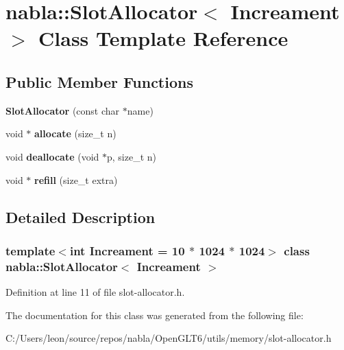 \hypertarget{classnabla_1_1_slot_allocator}{}\section{nabla\+::Slot\+Allocator$<$ Increament $>$ Class Template Reference}
\label{classnabla_1_1_slot_allocator}
\subsection*{Public Member Functions}
\begin{DoxyCompactItemize}
\item 
\mbox{\label{classnabla_1_1_slot_allocator_ad7420ddd23485e10c051502a30303ead}} 
{\bfseries Slot\+Allocator} (const char $\ast$name)
\item 
\mbox{\label{classnabla_1_1_slot_allocator_a68798c2c090a8435776be5c1fae69741}} 
void $\ast$ {\bfseries allocate} (size\+\_\+t n)
\item 
\mbox{\label{classnabla_1_1_slot_allocator_ac273b682057f051c4c226e397094b270}} 
void {\bfseries deallocate} (void $\ast$p, size\+\_\+t n)
\item 
\mbox{\label{classnabla_1_1_slot_allocator_af32ebf292dd6f77447e64cf0e3571e50}} 
void $\ast$ {\bfseries refill} (size\+\_\+t extra)
\end{DoxyCompactItemize}


\subsection{Detailed Description}
\subsubsection*{template$<$int Increament = 10 $\ast$ 1024 $\ast$ 1024$>$\newline
class nabla\+::\+Slot\+Allocator$<$ Increament $>$}



Definition at line 11 of file slot-\/allocator.\+h.



The documentation for this class was generated from the following file\+:\begin{DoxyCompactItemize}
\item 
C\+:/\+Users/leon/source/repos/nabla/\+Open\+G\+L\+T6/utils/memory/slot-\/allocator.\+h\end{DoxyCompactItemize}
